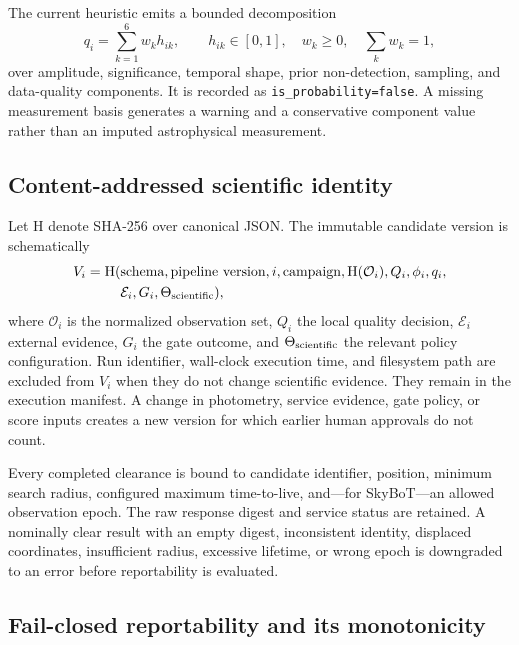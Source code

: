 \documentclass[11pt]{article}
\begin{document}
The current heuristic emits a bounded decomposition
\begin{equation}
  q_i=\sum_{k=1}^{6}w_k h_{ik},
  \qquad h_{ik}\in[0,1],\quad w_k\geq0,\quad \sum_k w_k=1,
\label{eq:siderea-score}
\end{equation}
over amplitude, significance, temporal shape, prior non-detection, sampling, and data-quality components. It is recorded as \texttt{is\_probability=false}. A missing measurement basis generates a warning and a conservative component value rather than an imputed astrophysical measurement.

\subsection{Content-addressed scientific identity}

Let $\mathrm{H}$ denote SHA-256 over canonical JSON. The immutable candidate version is schematically
\begin{equation}
\begin{split}
  V_i=\mathrm{H}(&\text{schema},\text{pipeline version},i,\text{campaign},
  \mathrm{H}(\mathcal{O}_i),Q_i,\phi_i,q_i,\\
  &\mathcal{E}_i,G_i,\Theta_{\rm scientific}),
\end{split}
\label{eq:candidate-version}
\end{equation}
where $\mathcal{O}_i$ is the normalized observation set, $Q_i$ the local quality decision, $\mathcal{E}_i$ external evidence, $G_i$ the gate outcome, and $\Theta_{\rm scientific}$ the relevant policy configuration. Run identifier, wall-clock execution time, and filesystem path are excluded from $V_i$ when they do not change scientific evidence. They remain in the execution manifest. A change in photometry, service evidence, gate policy, or score inputs creates a new version for which earlier human approvals do not count.

Every completed clearance is bound to candidate identifier, position, minimum search radius, configured maximum time-to-live, and---for SkyBoT---an allowed observation epoch. The raw response digest and service status are retained. A nominally clear result with an empty digest, inconsistent identity, displaced coordinates, insufficient radius, excessive lifetime, or wrong epoch is downgraded to an error before reportability is evaluated.

\subsection{Fail-closed reportability and its monotonicity}
\end{document}
